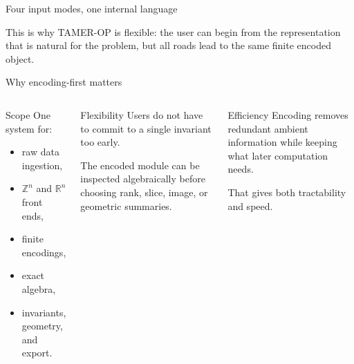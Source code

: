 \documentclass[aspectratio=169,11pt]{beamer}
\newcommand{\R}{\mathbb{R}}
\newcommand{\Z}{\mathbb{Z}}
\newcommand{\TAMER}{\textsc{TAMER-OP}}
\begin{document}
\begin{frame}{Four input modes, one internal language}
\small
\centering
{}

\medskip
\raggedright
This is why \TAMER{} is flexible: the user can begin from the representation that is natural for the problem, but all roads lead to the same finite encoded object.
\end{frame}

\begin{frame}{Why encoding-first matters}
\small
\begin{columns}[T,totalwidth=\textwidth]
\begin{block}{Scope}
One system for:
\begin{itemize}
  \item raw data ingestion,
  \item $\Z^n$ and $\R^n$ front ends,
  \item finite encodings,
  \item exact algebra,
  \item invariants, geometry, and export.
\end{itemize}
\end{block}

\begin{block}{Flexibility}
Users do not have to commit to a single invariant too early.

\medskip
The encoded module can be inspected algebraically before choosing rank, slice, image, or geometric summaries.
\end{block}

\begin{block}{Efficiency}
Encoding removes redundant ambient information while keeping what later computation needs.

\medskip
That gives both tractability and speed.
\end{block}
\end{columns}
\end{frame}
\end{document}
